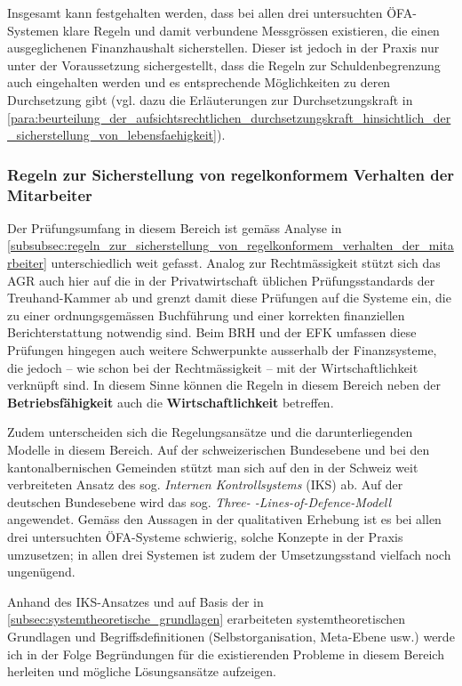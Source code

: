 \documentclass[10pt]{article}
\begin{document}
Insgesamt kann festgehalten werden, dass bei allen drei untersuchten ÖFA-Systemen klare Regeln und damit verbundene Messgrössen existieren, die einen ausge­glichenen Finanzhaushalt sicherstellen. Dieser ist jedoch in der Praxis nur unter der Voraussetzung sichergestellt, dass die Regeln zur Schulden­begrenzung auch eingehalten werden und es entsprechende Möglichkeiten zu deren Durchsetzung gibt (vgl. dazu die Erläuterungen zur Durchsetzungskraft in \vref{para:beurteilung_der_aufsichtsrechtlichen_durchsetzungskraft_hinsichtlich_der_sicherstellung_von_lebensfaehigkeit}).

\subsubsection{Regeln zur Sicherstellung von regelkonformem Verhalten der Mitarbeiter}\label{subsubsec:regeln_zur_sicherstellung_von_regelkonformem_verhalten_der_mitarbeiter}
Der Prüfungsumfang in diesem Bereich ist gemäss Analyse in \vref{subsubsec:regeln_zur_sicherstellung_von_regelkonformem_verhalten_der_mitarbeiter} unterschiedlich weit gefasst. Analog zur Rechtmässigkeit stützt sich das AGR auch hier auf die in der Privatwirtschaft üblichen Prüfungsstandards der Treuhand-Kammer ab und grenzt damit diese Prüfungen auf die Systeme ein, die zu einer ordnungsgemässen Buchführung und einer korrekten finanziellen Berichterstattung notwendig sind. Beim BRH und der EFK umfassen diese Prüfungen hingegen auch weitere Schwerpunkte ausserhalb der Finanzsysteme, die jedoch -- wie schon bei der Rechtmässigkeit -- mit der Wirtschaftlichkeit verknüpft sind. In diesem Sinne können die Regeln in diesem Bereich neben der \textbf{Betriebsfähigkeit} auch die \textbf{Wirtschaftlichkeit} betreffen.

Zudem unterscheiden sich die Regelungsansätze und die darunterliegenden Modelle in diesem Bereich. Auf der schweizerischen Bundesebene und bei den kantonalbernischen Gemeinden stützt man sich auf den in der Schweiz weit verbreiteten Ansatz des sog. \textit{Internen Kontrollsystems} (IKS) ab. Auf der deutschen Bundesebene wird das sog. \textit{Three- -Lines-of-Defence-Modell} angewendet. Gemäss den Aussagen in der qualitativen Erhebung ist es bei allen drei untersuchten ÖFA-Systeme schwierig, solche Konzepte in der Praxis umzusetzen; in allen drei Systemen ist zudem der Umsetzungsstand vielfach noch ungenügend.

Anhand des IKS-Ansatzes und auf Basis der in \vref{subsec:systemtheoretische_grundlagen} erarbeiteten systemtheoretischen Grundlagen und Begriffsdefinitionen (Selbstorganisation, Meta-Ebene usw.) werde ich in der Folge Begründungen für die existierenden Probleme in diesem Bereich herleiten und mögliche Lösungsansätze aufzeigen.
\end{document}
